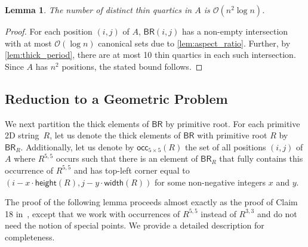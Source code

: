 \documentclass[11pt,letterpaper]{article}
\newcommand{\cO}{\mathcal{O}}
\newcommand{\width}{\textsf{width}}
\newcommand{\height}{\textsf{height}}
\newcommand{\BR}{\textsf{BR}}
\newcommand{\OCR}{\textsf{occ}_{5\times 5}}
\newtheorem{lemma}[theorem]{Lemma}
\begin{document}
\begin{lemma}\label{lem:nonthick}
The number of distinct thin quartics in $A$ is $\cO(n^2 \log n )$.
\end{lemma}
\begin{proof}
For each position $(i,j)$ of $A$, $\BR(i,j)$ has a non-empty intersection with at most $\cO(\log n)$ canonical sets due to \cref{lem:aspect_ratio}.
Further, by \cref{lem:thick_period}, there are at most 10 thin quartics in each such intersection.
Since $A$ has $n^2$ positions, the stated bound follows.
\end{proof}
\subsection{Reduction to a Geometric Problem}
We next partition the thick elements of $\BR$ by primitive root.
For each primitive 2D string~$R$, let us denote the thick elements of $\BR$ with primitive root $R$ by $\BR_R$.
Additionally, let us denote by $\OCR(R)$ the set of all positions $(i,j)$ of $A$ where $R^{5,5}$ occurs such that there is an element of $\BR_R$ that fully contains this occurrence of $R^{5,5}$ and has top-left corner equal to $(i-x \cdot \height(R), j-y \cdot \width(R))$ for some non-negative integers $x$ and $y$.

The proof of the following lemma proceeds almost exactly as the proof of Claim 18 in~\cite{CRRWZ}, except that 
we work with  occurrences of $R^{5,5}$ instead of $R^{3,3}$ and do not need the notion of special points.
We provide a detailed description for completeness.
\end{document}
